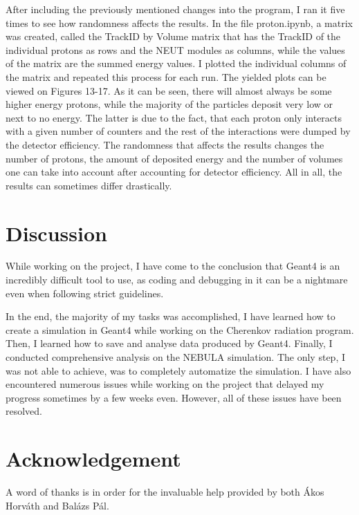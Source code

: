 \documentclass[12pt,twocolumn]{article}
\begin{document}
After including the previously mentioned changes into the program, I ran it five times to see how randomness affects the results. In the file proton.ipynb, a matrix was created, called the TrackID by Volume matrix that has the TrackID of the individual protons as rows and the NEUT modules as columns, while the values of the matrix are the summed energy values. I plotted the individual columns of the matrix and repeated this process for each run. The yielded plots can be viewed on Figures 13-17. As it can be seen, there will almost always be some higher energy protons, while the majority of the particles deposit very low or next to no energy. The latter is due to the fact, that each proton only interacts with a given number of counters and the rest of the interactions were dumped by the detector efficiency. The randomness that affects the results changes the number of protons, the amount of deposited energy and the number of volumes one can take into account after accounting for detector efficiency. All in all, the results can sometimes differ drastically.

\section{Discussion}

While working on the project, I have come to the conclusion that Geant4 is an incredibly difficult tool to use, as coding and debugging in it can be a nightmare even when following strict guidelines.

In the end, the majority of my tasks was accomplished, I have learned how to create a simulation in Geant4 while working on the Cherenkov radiation program. Then, I learned how to save and analyse data produced by Geant4. Finally, I conducted comprehensive analysis on the NEBULA simulation. The only step, I was not able to achieve, was to completely automatize the simulation. I have also encountered numerous issues while working on the project that delayed my progress sometimes by a few weeks even. However, all of these issues have been resolved.

\section*{Acknowledgement}
A word of thanks is in order for the invaluable help provided by both Ákos Horváth and Balázs Pál.






\onecolumn
\end{document}
